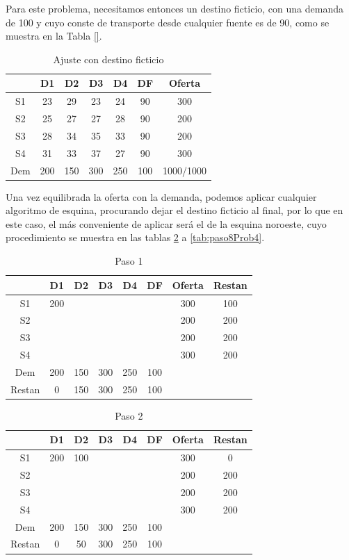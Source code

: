 \documentclass[12pt]{article}  %
\begin{document}
Para este problema, necesitamos entonces un destino ficticio, con una demanda de 100 y cuyo conste de transporte desde cualquier fuente es de 90, como se muestra en la Tabla \ref{}.

\begin{table}[H]
\centering
\caption{Ajuste con destino ficticio}
\label{tab:ajusteProb4}
\begin{tabular}{c|ccccc|c}
& D1 & D2 & D3 & D4 & DF & Oferta \\
\hline
S1 & 23 & 29 & 23 & 24 & \cellcolor{orange} 90 & 300 \\
S2 & 25 & 27 & 27 & 28 & \cellcolor{orange} 90 & 200 \\
S3 & 28 & 34 & 35 & 33 & \cellcolor{orange} 90 & 200 \\
S4 & 31 & 33 & 37 & 27 & \cellcolor{orange} 90 & 300 \\
\hline
Dem & 200 & 150 & 300 & 250 & \cellcolor{orange} 100 & \mbox{1000/1000} 
\end{tabular}
\end{table}

Una vez equilibrada la oferta con la demanda, podemos aplicar cualquier algoritmo de esquina, procurando dejar el destino ficticio al final, por lo que en este caso, el más conveniente de aplicar será el de la esquina noroeste, cuyo procedimiento se muestra en las tablas \ref{tab:paso1Prob4} a \ref{tab:paso8Prob4}.

\begin{table}[H]
\centering
\caption{Paso 1}
\label{tab:paso1Prob4}
\begin{tabular}{c|ccccc|cc}
& D1 & D2 & D3 & D4 & DF & Oferta & Restan \\
\hline
S1 & \cellcolor{yellow}200 & & & & & 300 & 100 \\
S2 & & & & & & 200 & 200 \\
S3 & & & & & & 200 & 200 \\
S4 & & & & & & 300 & 200 \\
\hline
Dem & 200 & 150 & 300 & 250 & 100 & & \\
Restan & 0 & 150 & 300 & 250 & 100 & & 
\end{tabular}
\end{table}

\begin{table}[H]
\centering
\caption{Paso 2}
\label{tab:paso2Prob4}
\begin{tabular}{c|ccccc|cc}
& D1 & D2 & D3 & D4 & DF & Oferta & Restan \\
\hline
S1 & 200 & \cellcolor{yellow}100 & & & & 300 & 0 \\
S2 & & & & & & 200 & 200 \\
S3 & & & & & & 200 & 200 \\
S4 & & & & & & 300 & 200 \\
\hline
Dem & 200 & 150 & 300 & 250 & 100 & & \\
Restan & 0 & 50 & 300 & 250 & 100 & & 
\end{tabular}
\end{table}
\end{document}
